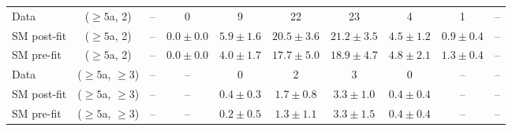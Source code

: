\begin{table}[h!]
{\begin{tabular}{lccccccccc}
	Data        & ($\ge5$a, 2)      & --                   & 0                    & 9                  & 22                 & 23                 & 4                & 1                & --           \\[0.5ex] 
	SM post-fit & ($\ge5$a, 2)      & --                   & $0.0\pm{ 0.0 }$      & $5.9\pm{ 1.6 }$    & $20.5\pm{ 3.6 }$   & $21.2\pm{ 3.5 }$   & $4.5\pm{ 1.2 }$  & $0.9\pm{ 0.4 }$  & --           \\[0.5ex] 
	SM pre-fit  & ($\ge5$a, 2)      & --                   & $0.0\pm{ 0.0 }$      & $4.0\pm{ 1.7 }$    & $17.7\pm{ 5.0 }$   & $18.9\pm{ 4.7 }$   & $4.8\pm{ 2.1 }$  & $1.3\pm{ 0.4 }$  & --           \\[0.5ex] 
	Data        & ($\ge5$a, $\ge3$) & --                   & --                   & 0                  & 2                  & 3                  & 0                & --               & --           \\[0.5ex] 
	SM post-fit & ($\ge5$a, $\ge3$) & --                   & --                   & $0.4\pm{ 0.3 }$    & $1.7\pm{ 0.8 }$    & $3.3\pm{ 1.0 }$    & $0.4\pm{ 0.4 }$  & --               & --           \\[0.5ex] 
	SM pre-fit  & ($\ge5$a, $\ge3$) & --                   & --                   & $0.2\pm{ 0.5 }$    & $1.3\pm{ 1.1 }$    & $3.3\pm{ 1.5 }$    & $0.4\pm{ 0.4 }$  & --               & --           \\[0.5ex] 
	\hline
	\hline
\end{tabular}}
\end{table}

